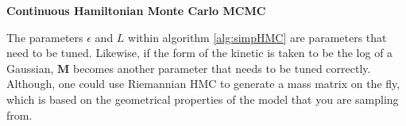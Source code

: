 \begin{algorithm}
	\caption{\textbf{Continuous Hamiltonian Monte Carlo MCMC}}
	\begin{algorithmic}[1]
		\EndFor
		  
		\Else
		 
		\EndIf
		\EndFor
		\EndProcedure
	\end{algorithmic}
   \label{alg:simpHMC} 
\end{algorithm}

The parameters  $\epsilon$ and $L$ within algorithm \ref{alg:simpHMC} are parameters that need to be tuned. Likewise, if the form of the kinetic is taken to be the log of a Gaussian, $\textbf{M}$ becomes another parameter that needs to be tuned correctly. Although, one could use Riemannian HMC \citep{girolami2011riemann} to generate a mass matrix on the fly, which is based on the geometrical properties of the model that you are sampling from.

 
